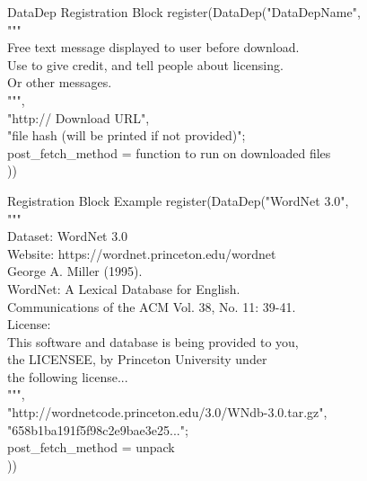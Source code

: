 \documentclass[dvipsnames]{beamer}
\begin{document}
\begin{frame}[fragile]{DataDep Registration Block}
	\small
	\ttfamily
	\color{Blue}
	register(DataDep("DataDepName",\\
	\color{Green}
	"""\\
	Free text message displayed to user before download.\\
	Use to give credit, and tell people about licensing.\\
	Or other messages.\\
	""",\\
	\color{Orange}
	"http:// Download URL",\\
	\color{Red}
	"file hash (will be printed if not provided)";\\
	\color{Purple}
	post\_fetch\_method = function to run on downloaded files\\
	\color{Blue}
	))
	\vfill\vfill\vfill\null
\end{frame}


\begin{frame}[fragile]{ Registration Block Example}
	\small
	\ttfamily
	\color{Blue}
	register(DataDep("WordNet 3.0",\\
	\color{Green}
	"""\\
	Dataset: WordNet 3.0\\
	Website: https://wordnet.princeton.edu/wordnet\\
	\vspace{0.5em}
	George A. Miller (1995). \\
	WordNet: A Lexical Database for English.\\
	Communications of the ACM Vol. 38, No. 11: 39-41.\\
	\vspace{0.5em}
	License:\\
	This software and database is being provided to you,\\
	the LICENSEE, by Princeton University under\\
	the following license...\\
	""",\\
	\color{Orange}
	"http://wordnetcode.princeton.edu/3.0/WNdb-3.0.tar.gz",\\
	\color{Red}
	"658b1ba191f5f98c2e9bae3e25...";\\
	\color{Purple}
	post\_fetch\_method = unpack\\
	\color{Blue}
	))
	\vfill\vfill\vfill\null
\end{frame}
\end{document}
